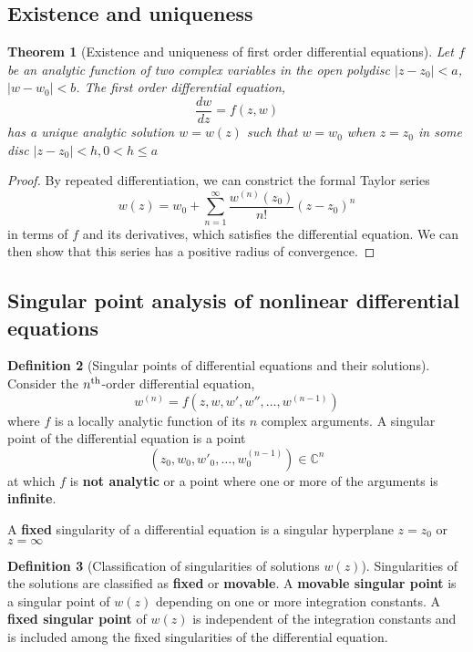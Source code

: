 \documentclass[10pt, oneside, reqno]{amsart}
\theoremstyle{plain}%
\newtheorem{thm}{Theorem}[section]
\theoremstyle{definition}
\newtheorem{defn}[thm]{Definition}
\theoremstyle{remark}
\newcommand{\Com}{\mathbb{C}}
\newcommand{\nth}{n\textsuperscript{th}}
\begin{document}
\subsection{Existence and uniqueness} %
\label{sec:existence_and_uniqueness}


\begin{thm}[Existence and uniqueness of first order differential equations]
	Let $f$ be an analytic function of two complex variables in the open polydisc $|z - z_0| < a$, $|w - w_0| < b$.
	The first order differential equation,
	\[
		\frac{dw}{dz} = f(z,w)
	\] has a unique analytic solution $w = w(z)$ such that $w = w_0$ when $ z = z_0$ in some disc $|z - z_0| < h, 0 < h \leq a$
\end{thm}

\begin{proof}
	By repeated differentiation, we can constrict the formal Taylor series \[
		w(z) = w_0 + \sum_{n=1}^\infty \frac{w^{(n)}(z_0)}{n!} (z - z_0)^n
	\] in terms of $f$ and its derivatives, which satisfies the differential equation.  We can then show that this series has a positive radius of convergence.
\end{proof}


\subsection{Singular point analysis of nonlinear differential equations} %
\label{sec:singular_point_analysis_of_nonlinear_differential_equations}

\begin{defn}[Singular points of differential equations and their solutions]
	Consider the $\nth$-order differential equation,\[
		w^{(n)} = f(z, w, w', w'', \dots, w^{(n-1)})
	\] where $f$ is a locally analytic function of its $n$ complex arguments.  A singular point of the differential equation is a point \[
		(z_0, w_0, w'_0, \dots, w_0^{(n-1)}) \in \Com^n
	\]
	at which $f$ is \textbf{not analytic} or a point where one or more of the arguments is \textbf{infinite}.
	
	A \textbf{fixed} singularity of a differential equation is a singular hyperplane $z = z_0$ or $z = \infty$
\end{defn}

\begin{defn}[Classification of singularities of solutions $w(z)$]
	Singularities of the solutions are classified as \textbf{fixed} or \textbf{movable}.  A \textbf{movable singular point} is a singular point of $w(z)$ depending on one or more integration constants. 
	A \textbf{fixed singular point} of $w(z)$ is independent of the integration constants and is included among the fixed singularities of the differential equation.
\end{defn}
	
\end{document}
